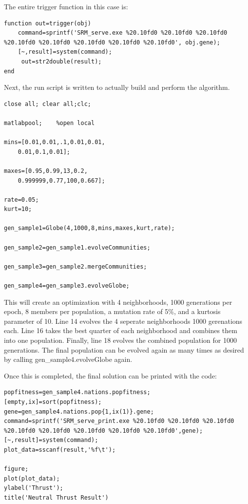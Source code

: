 \documentclass[conference]{IEEEtran}
\begin{document}
The entire trigger function in this case is:

\begin{lstlisting}
function out=trigger(obj)
    command=sprintf('SRM_serve.exe %20.10fd0 %20.10fd0 %20.10fd0 %20.10fd0 %20.10fd0 %20.10fd0 %20.10fd0 %20.10fd0', obj.gene);
    [~,result]=system(command);
     out=str2double(result);
end
\end{lstlisting}

Next, the run script is written to actually build and perform the algorithm.

\begin{lstlisting}
close all; clear all;clc;

matlabpool;    %open local 
  
mins=[0.01,0.01,.1,0.01,0.01,
	0.01,0.1,0.01];

maxes=[0.95,0.99,13,0.2,
	0.999999,0.77,100,0.667];
	
rate=0.05;
kurt=10;

gen_sample1=Globe(4,1000,8,mins,maxes,kurt,rate);

gen_sample2=gen_sample1.evolveCommunities;

gen_sample3=gen_sample2.mergeCommunities;

gen_sample4=gen_sample3.evolveGlobe;
\end{lstlisting}

This will create an optimization with 4 neighborhoods, 1000 generations per epoch, 8 members per population, a mutation rate of 5\%, and a kurtosis parameter of 10.  Line 14 evolves the 4 seperate neighborhoods 1000 gerenations each.  Line 16 takes the best quarter of each neighborhood and combines them into one population.  Finally, line 18 evolves the combined population for 1000 generations.  The final population can be evolved again as many times as desired by calling gen\_sample4.evolveGlobe again. 

Once this is completed, the final solution can be printed with the code:

\begin{lstlisting}
popfitness=gen_sample4.nations.popfitness;
[empty,ix]=sort(popfitness);
gene=gen_sample4.nations.pop{1,ix(1)}.gene;
command=sprintf('SRM_serve_print.exe %20.10fd0 %20.10fd0 %20.10fd0 %20.10fd0 %20.10fd0 %20.10fd0 %20.10fd0 %20.10fd0',gene);
[~,result]=system(command);
plot_data=sscanf(result,'%f\t');

figure;
plot(plot_data);
ylabel('Thrust');
title('Neutral Thrust Result')
\end{lstlisting}
\end{document}
